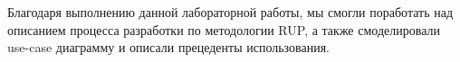 Благодаря выполнению данной лабораторной работы, мы смогли поработать над описанием
процесса разработки по методологии RUP, а также смоделировали use-case диаграмму и 
описали прецеденты использования.